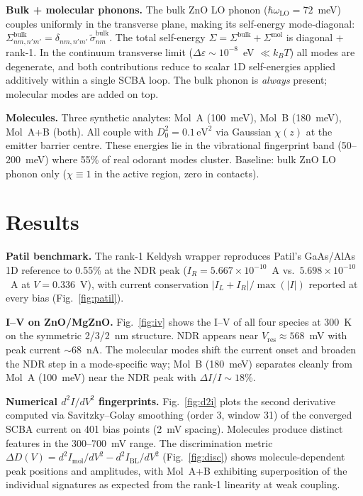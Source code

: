 \documentclass[conference]{IEEEtran}
\begin{document}
\textbf{Bulk + molecular phonons.} The bulk ZnO LO phonon
($\hbar\omega_{\mathrm{LO}} = 72$~meV) couples uniformly in the
transverse plane, making its self-energy mode-diagonal:
$\Sigma^{\mathrm{bulk}}_{nm,n'm'} = \delta_{nm,n'm'}\,\tilde\sigma^{\mathrm{bulk}}_{nm}$.
The total self-energy $\Sigma = \Sigma^{\mathrm{bulk}} + \Sigma^{\mathrm{mol}}$
is diagonal + rank-1. In the continuum transverse limit
($\Delta\varepsilon \sim 10^{-8}$~eV $\ll k_BT$) all modes are
degenerate, and both contributions reduce to scalar 1D self-energies
applied additively within a single SCBA loop. The bulk phonon is
\emph{always} present; molecular modes are added on top.

\textbf{Molecules.} Three synthetic analytes: Mol~A (100~meV),
Mol~B (180~meV), Mol~A+B (both). All couple with $D_0^2 = 0.1\,\mathrm{eV}^2$
via Gaussian $\chi(z)$ at the emitter barrier centre. These energies lie in
the vibrational fingerprint band (50--200~meV) where 55\% of real odorant
modes cluster. Baseline: bulk ZnO LO phonon only ($\chi \equiv 1$ in the
active region, zero in contacts).

\section{Results}

\textbf{Patil benchmark.} The rank-1 Keldysh wrapper reproduces
Patil's GaAs/AlAs 1D reference to 0.55\% at the NDR peak
($I_R = 5.667 \times 10^{-10}$~A vs.\ $5.698 \times 10^{-10}$~A at
$V = 0.336$~V), with current conservation $|I_L + I_R|/\max(|I|)$
reported at every bias (Fig.~\ref{fig:patil}).

\textbf{I--V on ZnO/MgZnO.} Fig.~\ref{fig:iv} shows the I--V of all
four species at 300~K on the symmetric 2/3/2~nm structure.
NDR appears near $V_{\mathrm{res}} \approx 568$~mV with peak current
$\sim 68$~nA. The molecular modes shift the current onset and broaden
the NDR step in a mode-specific way; Mol~B (180~meV) separates cleanly
from Mol~A (100~meV) near the NDR peak with $\Delta I/I \sim 18$\%.

\textbf{Numerical $d^2I/dV^2$ fingerprints.} Fig.~\ref{fig:d2i} plots the
second derivative computed via Savitzky--Golay smoothing (order 3, window
31) of the converged SCBA current on 401 bias points (2~mV spacing). Molecules produce
distinct features in the 300--700~mV range. The discrimination metric
$\Delta D(V) = d^2I_{\mathrm{mol}}/dV^2 - d^2I_{\mathrm{BL}}/dV^2$
(Fig.~\ref{fig:disc}) shows molecule-dependent peak positions and
amplitudes, with Mol~A+B exhibiting superposition of the individual
signatures as expected from the rank-1 linearity at weak coupling.
\end{document}
